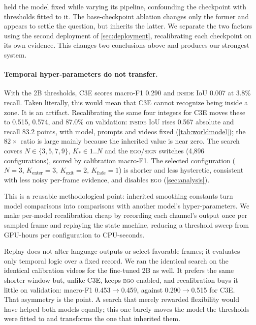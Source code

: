 \documentclass[journal]{IEEEtran}
\begin{document}
 held the model fixed while varying its pipeline, confounding the checkpoint with thresholds fitted to it.  The base-checkpoint ablation changes only the former and appears to settle the question, but inherits the latter.  We separate the two factors using the second deployment of \cref{sec:deployment}, recalibrating each checkpoint on its own evidence.  This changes two conclusions above and produces our strongest system.

\paragraph{Temporal hyper-parameters do not transfer.}  With the 2B thresholds, C3E scores macro-F1 0.290 and \textsc{inside} IoU 0.007 at 3.8\% recall.  Taken literally, this would mean that C3E cannot recognize being inside a zone.  It is an artifact.  Recalibrating the same four integers for C3E moves these to 0.515, 0.574, and 87.0\% on validation: \textsc{inside} IoU rises 0.567 absolute and recall 83.2 points, with model, prompts and videos fixed (\cref{tab:worldmodel}); the $82\times$ ratio is large mainly because the inherited value is near zero.  The search covers $N\in\{3,5,7,9\}$, $K_\ast\in 1..N$ and the \textsc{ego}/\textsc{sign} switches (4{,}896 configurations), scored by calibration macro-F1.  The selected configuration ($N{=}3$, $K_{\text{enter}}{=}3$, $K_{\text{exit}}{=}2$, $K_{\text{fade}}{=}1$) is shorter and less hysteretic, consistent with less noisy per-frame evidence, and disables \textsc{ego} (\cref{sec:analysis}).

This is a reusable methodological point: inherited smoothing constants turn model comparisons into comparisons with another model's hyper-parameters.  We make per-model recalibration cheap by recording each channel's output once per sampled frame and replaying the state machine, reducing a threshold sweep from GPU-hours per configuration to CPU-seconds.

Replay does not alter language outputs or select favorable frames; it evaluates only temporal logic over a fixed record.  We ran the identical search on the identical calibration videos for the fine-tuned 2B as well.  It prefers the same shorter window but, unlike C3E, keeps \textsc{ego} enabled, and recalibration buys it little on validation: macro-F1 0.453$\to$0.459, against 0.290$\to$0.515 for C3E.  That asymmetry is the point.  A search that merely rewarded flexibility would have helped both models equally; this one barely moves the model the thresholds were fitted to and transforms the one that inherited them.
\end{document}
